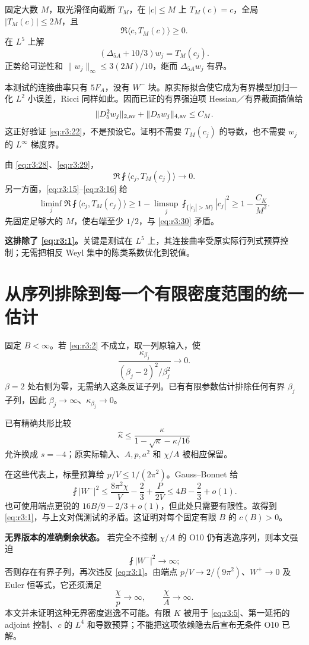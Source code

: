 \documentclass[UTF8,11pt,fontset=none]{ctexart}
\begin{document}
固定大数 \(M\)，取光滑径向截断 \(T_M\)，在 \(|c|\le M\) 上 \(T_M(c)=c\)，全局 \(|T_M(c)|\le2M\)，且 \[
 \Re\langle c,T_M(c)\rangle\ge0.
\] 在 \(L^5\) 上解 \[
 \boxed{(\Delta_{5A}+10/3)w_j=T_M(c_j).}
 \tag{3.29}\label{eq:r3:29}
\] 正势给可逆性和 \(\|w_j\|_\infty\le3(2M)/10\)，继而 \(\Delta_{5A}w_j\) 有界。

本测试的连接曲率只有 \(5F_A\)，没有 \(W^-\) 块。原实际拟合使它成为有界模型加归一化 \(L^2\) 小误差，Ricci 同样如此。因而已证的有界强迫项 Hessian／有界截面插值给 \[
 \|D_5^2w_j\|_{2,\rm av}+\|D_5w_j\|_{4,\rm av}\le C_M.
\] 这正好验证 \eqref{eq:r3:22}，不是预设它。证明不需要 \(T_M(c_j)\) 的导数，也不需要 \(w_j\) 的 \(L^\infty\) 梯度界。

由 \eqref{eq:r3:28}、\eqref{eq:r3:29}， \[
 \Re\fint\langle c_j,T_M(c_j)\rangle\longrightarrow0.
 \tag{3.30}\label{eq:r3:30}
\] 另一方面，\eqref{eq:r3:15}--\eqref{eq:r3:16} 给 \[
 \liminf_j\Re\fint\langle c_j,T_M(c_j)\rangle
 \ge 1-\limsup_j\fint_{\{|c_j|>M\}}|c_j|^2
 \ge1-\frac{C_K}{M^2}.
 \tag{3.31}\label{eq:r3:31}
\] 先固定足够大的 \(M\)，使右端至少 \(1/2\)，与 \eqref{eq:r3:30} 矛盾。

\textbf{这排除了 \eqref{eq:r3:1}。}关键是测试在 \(L^5\) 上，其连接曲率受原实际行列式预算控制；无需把相反 Weyl 集中的陈类系数优化到锐值。

\section{从序列排除到每一个有限密度范围的统一估计}\label{ch3:ux4eceux5e8fux5217ux6392ux9664ux5230ux6bcfux4e00ux4e2aux6709ux9650ux5bc6ux5ea6ux8303ux56f4ux7684ux7edfux4e00ux4f30ux8ba1}

固定 \(B<\infty\)。若 \eqref{eq:r3:2} 不成立，取一列原输入，使 \[
 \frac{\kappa_{\beta_j}}{(\beta_j-2)^2/\beta_j^2}\to0.
\] \(\beta=2\) 处右侧为零，无需纳入这条反证子列。已有有限参数估计排除任何有界 \(\beta_j\) 子列，因此 \(\beta_j\to\infty\)、\(\kappa_{\beta_j}\to0\)。

已有精确共形比较 \[
 \widehat\kappa\le
 \frac{\kappa}{1-\sqrt\kappa-\kappa/16}
\] 允许换成 \(s=-4\)；原实际输入、\(A,p,a^2\) 和 \(\chi/A\) 被相应保留。

在这些代表上，标量预算给 \(p/V\le1/(2\pi^2)\)。Gauss--Bonnet 给 \[
 \fint|W^-|^2
 \le \frac{8\pi^2\chi}{V}-\frac23+\frac{P}{2V}
 \le4B-\frac23+o(1).
\] 也可使用端点更锐的 \(16B/9-2/3+o(1)\)，但此处只需要有限性。故得到 \eqref{eq:r3:1}，与上文对偶测试的矛盾。这证明对每个固定有限 \(B\) 的 \(c(B)>0\)。

\textbf{无界版本的准确剩余状态。} 若完全不控制 \(\chi/A\) 的 O10 仍有逃逸序列，则本文强迫 \[
 \fint|W^-|^2\longrightarrow\infty;
\] 否则存在有界子列，再次违反 \eqref{eq:r3:1}。由端点 \(p/V\to2/(9\pi^2)\)、\(W^+\to0\) 及 Euler 恒等式，它还须满足 \[
 \frac\chi p\longrightarrow\infty,
 \qquad \frac\chi A\longrightarrow\infty.
\] 本文并未证明这种无界密度逃逸不可能。有限 \(K\) 被用于 \eqref{eq:r3:5}、第一延拓的 adjoint 控制、\(c\) 的 \(L^4\) 和导数预算；不能把这项依赖隐去后宣布无条件 O10 已解。
\end{document}

